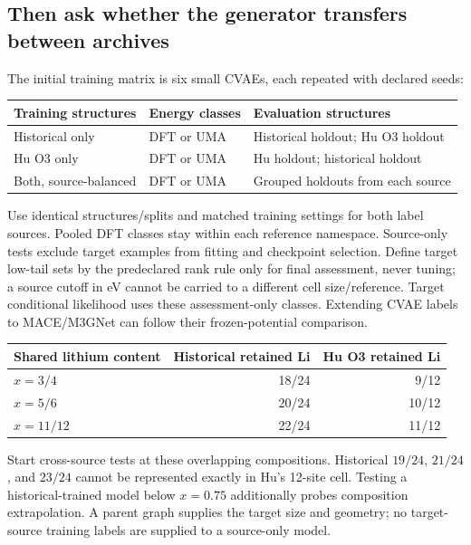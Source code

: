 \subsection*{Then ask whether the generator transfers between archives}
The initial training matrix is six small CVAEs, each repeated with declared seeds:
\begin{center}\small
\begin{tabular}{lll}
\toprule
Training structures & Energy classes & Evaluation structures\\
\midrule
Historical only &DFT or UMA & Historical holdout; Hu O3 holdout\\
Hu O3 only &DFT or UMA & Hu holdout; historical holdout\\
Both, source-balanced &DFT or UMA & Grouped holdouts from each source\\
\bottomrule
\end{tabular}
\end{center}
Use identical structures/splits and matched training settings for both label sources. Pooled DFT classes stay within each reference namespace. Source-only tests exclude target examples from fitting and checkpoint selection. Define target low-tail sets by the predeclared rank rule only for final assessment, never tuning; a source cutoff in eV cannot be carried to a different cell size/reference. Target conditional likelihood uses these assessment-only classes. Extending CVAE labels to MACE/M3GNet can follow their frozen-potential comparison.

\begin{center}\small
\begin{tabular}{lrr}
\toprule
Shared lithium content & Historical retained Li & Hu O3 retained Li\\
\midrule
$x=3/4$ &18/24 &9/12\\
$x=5/6$ &20/24 &10/12\\
$x=11/12$ &22/24 &11/12\\
\bottomrule
\end{tabular}
\end{center}
Start cross-source tests at these overlapping compositions. Historical $19/24$, $21/24$, and $23/24$ cannot be represented exactly in Hu's 12-site cell. Testing a historical-trained model below $x=0.75$ additionally probes composition extrapolation. A parent graph supplies the target size and geometry; no target-source training labels are supplied to a source-only model.


